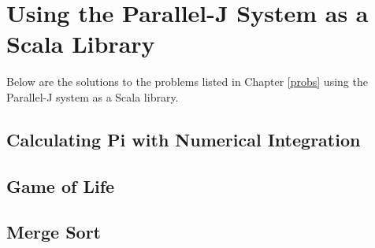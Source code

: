 \chapter{Using the Parallel-J System as a Scala Library}
\label{apsol}

Below are the solutions to the problems listed in Chapter \ref{probs} 
using the Parallel-J system as a Scala library.

\section{Calculating Pi with Numerical Integration}
\label{pjsPi}
\begin{singlespacing} 
\begin{small}
\end{small}
\end{singlespacing}

\section{Game of Life}
\label{pjsGol}
\begin{singlespacing} 
\begin{small}
\end{small}
\end{singlespacing}

\section{Merge Sort}
\label{pjsMrg}
\begin{singlespacing}
\begin{small}
\end{small}
\end{singlespacing}
